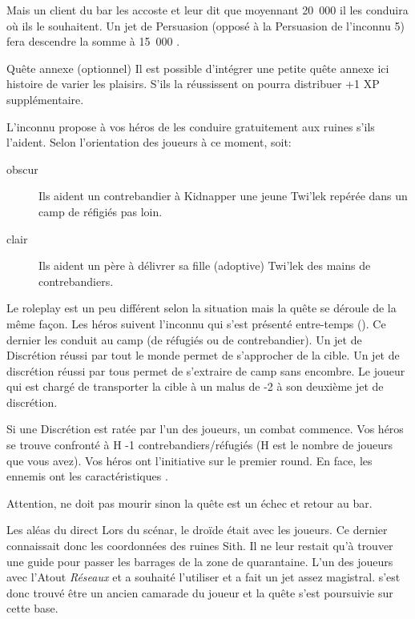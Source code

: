 Mais un client du bar les accoste et leur dit que moyennant 20~000 \crg il les conduira où ils le souhaitent. Un jet de Persuasion (opposé à la Persuasion de l’inconnu 5) fera descendre la somme à 15~000 \crg.

\begin{paperbox}{Quête annexe (optionnel)}
    Il est possible d’intégrer une petite quête annexe ici histoire de varier les plaisirs. S’ils la réussissent on pourra distribuer +1 XP supplémentaire.

    L’inconnu propose à vos héros de les conduire gratuitement aux ruines s’ils l’aident. Selon l’orientation des joueurs à ce moment, soit:
    \begin{description}
        \item [obscur] Ils aident un contrebandier à Kidnapper une jeune Twi’lek repérée dans un camp de réfigiés pas loin.
        \item [clair] Ils aident un père à délivrer sa fille (adoptive) Twi’lek des mains de contrebandiers.
    \end{description}

    Le roleplay est un peu différent selon la situation mais la quête se déroule de la même façon. Les héros suivent l’inconnu qui s’est présenté entre-temps (). Ce dernier les conduit au camp (de réfugiés ou de contrebandier). Un jet de Discrétion réussi par tout le monde permet de s’approcher de la cible. Un jet de discrétion réussi par tous permet de s’extraire de camp sans encombre. Le joueur qui est chargé de transporter la cible à un malus de -2 à son deuxième jet de discrétion.

    Si une Discrétion est ratée par l’un des joueurs, un combat commence. Vos héros se trouve confronté à H -1 contrebandiers/réfugiés (H est le nombre de joueurs que vous avez). Vos héros ont l’initiative sur le premier round. En face, les ennemis ont les caractéristiques .

    Attention,  ne doit pas mourir sinon la quête est un échec et retour au bar. 
\end{paperbox}

\begin{paperbox}{Les aléas du direct}
    Lors du scénar, le droïde était avec les joueurs. Ce dernier connaissait donc les coordonnées des ruines Sith. Il ne leur restait qu’à trouver une guide pour passer les barrages de la zone de quarantaine. L’un des joueurs avec l’Atout \textit{Réseaux} et a souhaité l’utiliser et a fait un jet assez magistral.  s’est donc trouvé être un ancien camarade du joueur et la quête s’est poursuivie sur cette base.
\end{paperbox}

